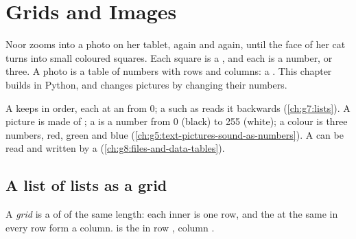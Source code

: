 \chapter{Grids and Images}\label{ch:g9:grids-and-images}

Noor zooms into a photo on her tablet, again and again, until the face of her
cat turns into small coloured squares. Each square is a , and each 
is a number, or three. A photo is a table of numbers with rows and columns:
a . This chapter builds  in Python, and changes pictures by changing
their numbers.

\begin{recall}
A  keeps  in order, each at an  from 0; a  such as
 reads it backwards (\cref{ch:g7:lists}). A picture is made
of ; a  is a number from 0 (black) to 255 (white); a colour is
three numbers, red, green and blue (\cref{ch:g5:text-pictures-sound-as-numbers}).
A  can be read and written by a 
(\cref{ch:g8:files-and-data-tables}).
\end{recall}

\section{A list of lists as a grid}

\begin{definition}[Grid]\label{def:g9:grids-and-images:grid}
A \emph{grid} is a  of  of the same length: each inner
 is one row, and the  at the same  in every row form a column.
 is the  in row , column .
\end{definition}

